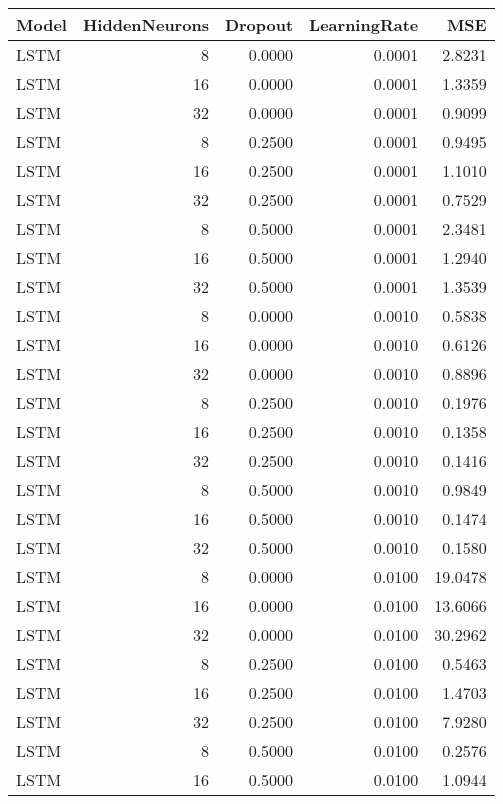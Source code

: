 \begin{table}[h!]
\centering
 \begin{adjustbox}{max width=\textwidth}
\begin{tabular}{lrrrr}
  \hline
Model & HiddenNeurons & Dropout & LearningRate & MSE \\ 
  \hline
LSTM &     8 & 0.0000 & 0.0001 & 2.8231 \\ 
  LSTM &    16 & 0.0000 & 0.0001 & 1.3359 \\ 
  LSTM &    32 & 0.0000 & 0.0001 & 0.9099 \\ 
  LSTM &     8 & 0.2500 & 0.0001 & 0.9495 \\ 
  LSTM &    16 & 0.2500 & 0.0001 & 1.1010 \\ 
  LSTM &    32 & 0.2500 & 0.0001 & 0.7529 \\ 
  LSTM &     8 & 0.5000 & 0.0001 & 2.3481 \\ 
  LSTM &    16 & 0.5000 & 0.0001 & 1.2940 \\ 
  LSTM &    32 & 0.5000 & 0.0001 & 1.3539 \\ 
  LSTM &     8 & 0.0000 & 0.0010 & 0.5838 \\ 
  LSTM &    16 & 0.0000 & 0.0010 & 0.6126 \\ 
  LSTM &    32 & 0.0000 & 0.0010 & 0.8896 \\ 
  LSTM &     8 & 0.2500 & 0.0010 & 0.1976 \\ 
  LSTM &    16 & 0.2500 & 0.0010 & 0.1358 \\ 
  LSTM &    32 & 0.2500 & 0.0010 & 0.1416 \\ 
  LSTM &     8 & 0.5000 & 0.0010 & 0.9849 \\ 
  LSTM &    16 & 0.5000 & 0.0010 & 0.1474 \\ 
  LSTM &    32 & 0.5000 & 0.0010 & 0.1580 \\ 
  LSTM &     8 & 0.0000 & 0.0100 & 19.0478 \\ 
  LSTM &    16 & 0.0000 & 0.0100 & 13.6066 \\ 
  LSTM &    32 & 0.0000 & 0.0100 & 30.2962 \\ 
  LSTM &     8 & 0.2500 & 0.0100 & 0.5463 \\ 
  LSTM &    16 & 0.2500 & 0.0100 & 1.4703 \\ 
  LSTM &    32 & 0.2500 & 0.0100 & 7.9280 \\ 
  LSTM &     8 & 0.5000 & 0.0100 & 0.2576 \\ 
  LSTM &    16 & 0.5000 & 0.0100 & 1.0944 \\ 

\end{tabular}
\end{adjustbox}
\end{table}
